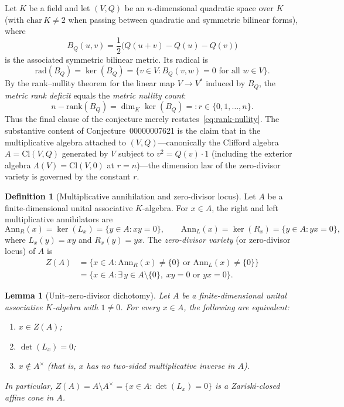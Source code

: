 \documentclass[11pt,a4paper]{article}
\newtheorem{lemma}[theorem]{Lemma}
\theoremstyle{definition}
\newtheorem{definition}[theorem]{Definition}
\theoremstyle{remark}
\newcommand{\Cl}{\mathrm{Cl}}
\newcommand{\Ann}{\mathrm{Ann}}
\newcommand{\rank}{\mathrm{rank}}
\newcommand{\rad}{\mathrm{rad}}
\begin{document}
Let $K$ be a field and let $(V, Q)$ be an $n$-dimensional quadratic space over $K$ (with $\mathrm{char}\,K \neq 2$ when passing between quadratic and symmetric bilinear forms), where
\[
B_Q(u, v) = \frac{1}{2}\bigl(Q(u + v) - Q(u) - Q(v)\bigr)
\]
is the associated symmetric bilinear metric. Its radical is
\[
\rad(B_Q) = \ker(B_Q) = \{v \in V : B_Q(v, w) = 0 \text{ for all } w \in V\}.
\]
By the rank--nullity theorem for the linear map $V \to V^*$ induced by $B_Q$, the \emph{metric rank deficit} equals the \emph{metric nullity count}:
\begin{equation}\label{eq:rank-nullity}
n - \rank(B_Q) = \dim_K \ker(B_Q) =: r \in \{0, 1, \dots, n\}.
\end{equation}
Thus the final clause of the conjecture merely restates~\eqref{eq:rank-nullity}. The substantive content of Conjecture~00000007621 is the claim that in the multiplicative algebra attached to $(V, Q)$---canonically the Clifford algebra $A = \Cl(V, Q)$ generated by $V$ subject to $v^2 = Q(v)\cdot 1$ (including the exterior algebra $\Lambda(V) = \Cl(V, 0)$ at $r = n$)---the dimension law of the zero-divisor variety is governed by the constant $r$.

\begin{definition}[Multiplicative annihilation and zero-divisor locus]
Let $A$ be a finite-dimensional unital associative $K$-algebra. For $x \in A$, the right and left multiplicative annihilators are
\[
\Ann_R(x) = \ker(L_x) = \{y \in A : xy = 0\}, \qquad
\Ann_L(x) = \ker(R_x) = \{y \in A : yx = 0\},
\]
where $L_x(y) = xy$ and $R_x(y) = yx$. The \emph{zero-divisor variety} (or zero-divisor locus) of $A$ is
\begin{align*}
Z(A) &= \{x \in A : \Ann_R(x) \neq \{0\} \text{ or } \Ann_L(x) \neq \{0\}\} \\
     &= \{x \in A : \exists\, y \in A \setminus \{0\},\; xy = 0 \text{ or } yx = 0\}.
\end{align*}
\end{definition}

\begin{lemma}[Unit--zero-divisor dichotomy]\label{lem:dichotomy}
Let $A$ be a finite-dimensional unital associative $K$-algebra with $1 \neq 0$. For every $x \in A$, the following are equivalent:
\begin{enumerate}
\setlength{\itemsep}{2pt}\setlength{\parskip}{0pt}
\item[(i)] $x \in Z(A)$;
\item[(ii)] $\det(L_x) = 0$;
\item[(iii)] $x \notin A^\times$ (that is, $x$ has no two-sided multiplicative inverse in $A$).
\end{enumerate}
In particular, $Z(A) = A \setminus A^\times = \{x \in A : \det(L_x) = 0\}$ is a Zariski-closed affine cone in $A$.
\end{lemma}
\end{document}
